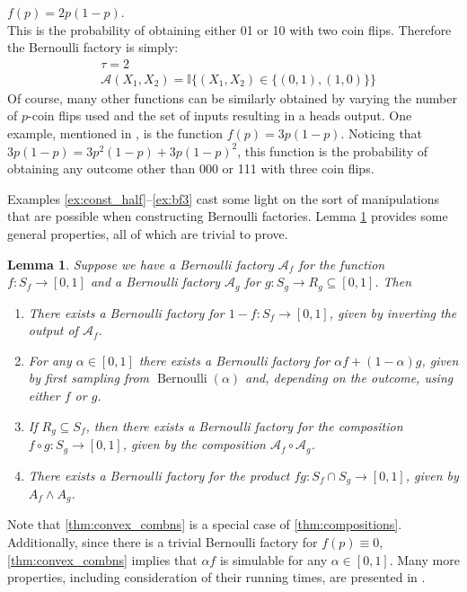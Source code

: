 \documentclass{article}
\newtheorem{lemma}{Lemma}
\theoremstyle{definition}
\newenvironment{example}
  {\pushQED{\qed}\renewcommand{\qedsymbol}{$\triangle$}\examplex}
  {\popQED\endexamplex}
\newcommand{\Bern}{\operatorname{Bernoulli}}
\newcommand{\A}{\mathcal{A}}
\begin{document}
\begin{example}\label{ex:bf3}
$f(p) = 2p(1-p)$.\\
This is the probability of obtaining either 01 or 10 with two coin flips. Therefore the Bernoulli factory is simply:
\begin{align*}
& \tau = 2 \\
& \A(X_1,X_2) = \mathbb{I}\{(X_1,X_2) \in \{(0,1),(1,0)\} \}
\end{align*}
Of course, many other functions can be similarly obtained by varying the number of $p$-coin flips used and the set of inputs resulting in a heads output. One example, mentioned in \citet{patel2018}, is the function $f(p) = 3p(1-p)$. Noticing that $3p(1-p) = 3p^2(1-p) + 3p(1-p)^2$, this function is the probability of obtaining any outcome other than 000 or 111 with three coin flips.
\end{example}

Examples \ref{ex:const_half}--\ref{ex:bf3} cast some light on the sort of manipulations that are possible when constructing Bernoulli factories. Lemma \ref{thm:products_compositions} provides some general properties, all of which are trivial to prove.

\begin{lemma}\label{thm:products_compositions}
Suppose we have a Bernoulli factory $\A_f$ for the function $f:S_f\to[0,1]$ and a Bernoulli factory $\A_g$ for $g:S_g\to R_g\subseteq[0,1]$. Then
\begin{enumerate}[label=(\alph*)]
\item There exists a Bernoulli factory for $1-f: S_f \to [0,1]$, given by inverting the output of $\A_f$.
\item \label{thm:convex_combns} For any $\alpha \in [0,1]$ there exists a Bernoulli factory for $\alpha f + (1-\alpha) g$, given by first sampling from $\Bern(\alpha)$ and, depending on the outcome, using either $f$ or $g$.
\item \label{thm:compositions} If $R_g \subseteq S_f$, then there exists a Bernoulli factory for the composition $f\circ g: S_g \to [0,1]$, given by the composition $\A_f \circ \A_g$.
\item \label{thm:products} There exists a Bernoulli factory for the product $fg:S_f \cap S_g \to [0,1]$, given by $A_f \wedge A_g$.
\end{enumerate}
\end{lemma}
Note that \ref{thm:convex_combns} is a special case of \ref{thm:compositions}.
Additionally, since there is a trivial Bernoulli factory for $f(p)\equiv 0$, \ref{thm:convex_combns} implies that $\alpha f$ is simulable for any $\alpha\in[0,1]$.
Many more properties, including consideration of their running times, are presented in \citet{nacu2005}.\\
\end{document}
